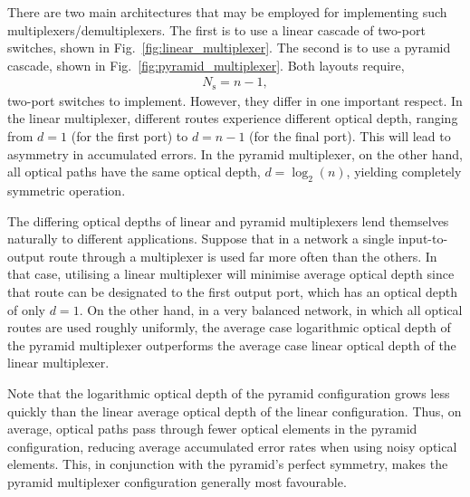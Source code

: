 There are two main architectures that may be employed for implementing such multiplexers/demultiplexers. The first is to use a linear cascade of two-port switches, shown in Fig.~\ref{fig:linear_multiplexer}. The second is to use a pyramid cascade, shown in Fig.~\ref{fig:pyramid_multiplexer}. Both layouts require,
\begin{align}
N_\mathrm{s} = n-1,
\end{align}
two-port switches to implement. However, they differ in one important respect. In the linear multiplexer, different routes experience different optical depth, ranging from \mbox{$d=1$} (for the first port) to \mbox{$d=n-1$} (for the final port). This will lead to asymmetry in accumulated errors. In the pyramid multiplexer, on the other hand, all optical paths have the same optical depth, \mbox{$d=\log_2(n)$}, yielding completely symmetric operation.

The differing optical depths of linear and pyramid multiplexers lend themselves naturally to different applications. Suppose that in a network a single input-to-output route through a multiplexer is used far more often than the others. In that case, utilising a linear multiplexer will minimise average optical depth since that route can be designated to the first output port, which has an optical depth of only \mbox{$d=1$}. On the other hand, in a very balanced network, in which all optical routes are used roughly uniformly, the average case logarithmic optical depth of the pyramid multiplexer outperforms the average case linear optical depth of the linear multiplexer.

Note that the logarithmic optical depth of the pyramid configuration grows less quickly than the linear average optical depth of the linear configuration. Thus, on average, optical paths pass through fewer optical elements in the pyramid configuration, reducing average accumulated error rates when using noisy optical elements. This, in conjunction with the pyramid's perfect symmetry, makes the pyramid multiplexer configuration generally most favourable.

